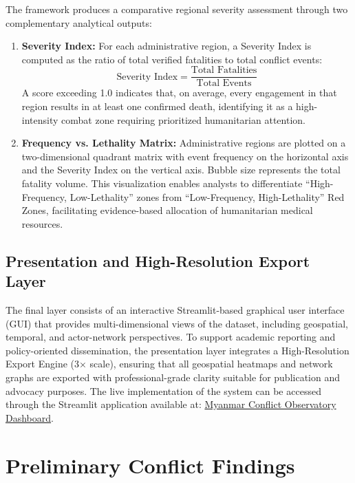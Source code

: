 \documentclass[conference]{IEEEtran}
\begin{document}
The framework produces a comparative regional severity assessment through two complementary analytical outputs:

\begin{enumerate}
    \item \textbf{Severity Index:} For each administrative region, a Severity Index is computed as the ratio of total verified fatalities to total conflict events:
    \[
    \text{Severity Index} = \frac{\text{Total Fatalities}}{\text{Total Events}}
    \]
    A score exceeding 1.0 indicates that, on average, every engagement in that region results in at least one confirmed death, identifying it as a high-intensity combat zone requiring prioritized humanitarian attention.

    \item \textbf{Frequency vs. Lethality Matrix:} Administrative regions are plotted on a two-dimensional quadrant matrix with event frequency on the horizontal axis and the Severity Index on the vertical axis. Bubble size represents the total fatality volume. This visualization enables analysts to differentiate ``High-Frequency, Low-Lethality'' zones from ``Low-Frequency, High-Lethality'' Red Zones, facilitating evidence-based allocation of humanitarian medical resources.
\end{enumerate}

\subsection{Presentation and High-Resolution Export Layer}

The final layer consists of an interactive Streamlit-based graphical user interface (GUI) that provides multi-dimensional views of the dataset, including geospatial, temporal, and actor-network perspectives. To support academic reporting and policy-oriented dissemination, the presentation layer integrates a High-Resolution Export Engine (3$\times$ scale), ensuring that all geospatial heatmaps and network graphs are exported with professional-grade clarity suitable for publication and advocacy purposes. The live implementation of the system can be accessed through the Streamlit application available at: \href{https://tainyantun-myanmar-conflict-observatory-app-mafeff.streamlit.app/}{Myanmar Conflict Observatory Dashboard}.

\section{Preliminary Conflict Findings}
\end{document}
